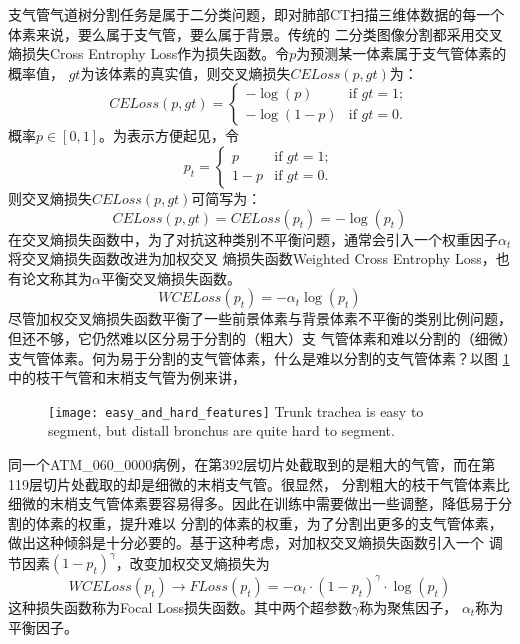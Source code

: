 支气管气道树分割任务是属于二分类问题，即对肺部CT扫描三维体数据的每一个体素来说，要么属于支气管，要么属于背景。传统的
二分类图像分割都采用交叉熵损失Cross Entrophy Loss作为损失函数。令$p$为预测某一体素属于支气管体素的概率值，
$\mathit{gt}$为该体素的真实值，则交叉熵损失$\mathit{CELoss}(p, \mathit{gt})$为：
\begin{equation}
	\mathit{CELoss}(p, \mathit{gt}) = \begin{cases}
		-\log{\left(p\right)} & \text{if } \mathit{gt} = 1; \\
		-\log{\left(1 - p\right)} & \text{if } \mathit{gt} = 0. 
	\end{cases}
\end{equation}
概率$p \in [0, 1]$。为表示方便起见，令
\begin{equation}
	p_t = \begin{cases}
		p & \text{if } \mathit{gt} = 1; \\
		1 - p & \text{if } \mathit{gt} = 0.
	\end{cases}
\end{equation}
则交叉熵损失$\mathit{CELoss}(p, gt)$可简写为：
\begin{equation}
	\mathit{CELoss}(p, \mathit{gt}) = \mathit{CELoss}(p_t) = -\log{\left(p_t\right)}
\end{equation}
在交叉熵损失函数中，为了对抗这种类别不平衡问题，通常会引入一个权重因子$\alpha_t$将交叉熵损失函数改进为加权交叉
熵损失函数Weighted Cross Entrophy Loss，也有论文称其为$\alpha$平衡交叉熵损失函数。
\begin{equation}
	\mathit{WCELoss}(p_t) = -\alpha_t \log{\left(p_t\right)}
\end{equation}
尽管加权交叉熵损失函数平衡了一些前景体素与背景体素不平衡的类别比例问题，但还不够，它仍然难以区分易于分割的（粗大）支
气管体素和难以分割的（细微）支气管体素。何为易于分割的支气管体素，什么是难以分割的支气管体素？以图
\ref{fig:easy_hard_bronchus}中的枝干气管和末梢支气管为例来讲，
\begin{figure}[!ht]
	\centering
	\texttt{[image: easy\_and\_hard\_features]}
		{Trunk trachea is easy to segment, but distall bronchus are quite hard to segment.}
	\label{fig:easy_hard_bronchus}
\end{figure}
同一个ATM\_060\_0000病例，在第392层切片处截取到的是粗大的气管，而在第119层切片处截取的却是细微的末梢支气管。很显然，
分割粗大的枝干气管体素比细微的末梢支气管体素要容易得多。因此在训练中需要做出一些调整，降低易于分割的体素的权重，提升难以
分割的体素的权重，为了分割出更多的支气管体素，做出这种倾斜是十分必要的。基于这种考虑，对加权交叉熵损失函数引入一个
调节因素$(1 - p_t)^{\gamma}$，改变加权交叉熵损失为
\begin{equation}
	\mathit{WCELoss}\left(p_t\right) \longrightarrow \mathit{FLoss}\left(p_t\right) = - \alpha_{t} \cdot \left(1 - p_t\right)^{\gamma} \cdot \log{\left(p_t\right)}
\end{equation}
这种损失函数称为Focal Loss损失函数。其中两个超参数$\gamma$称为聚焦因子，
$\alpha_{t}$称为平衡因子。

